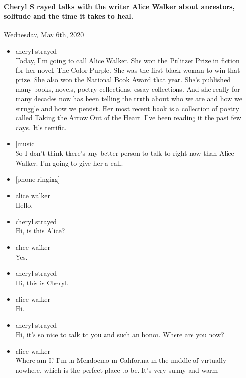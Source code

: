 \hypertarget{cheryl-strayed-talks-with-the-writer-alice-walker-about-ancestors-solitude-and-the-time-it-takes-to-heal-2}{%
\paragraph{Cheryl Strayed talks with the writer Alice Walker about
ancestors, solitude and the time it takes to
heal.}\label{cheryl-strayed-talks-with-the-writer-alice-walker-about-ancestors-solitude-and-the-time-it-takes-to-heal-2}}

Wednesday, May 6th, 2020

\begin{itemize}
\item
  cheryl strayed\\
  Today, I'm going to call Alice Walker. She won the Pulitzer Prize in
  fiction for her novel, The Color Purple. She was the first black woman
  to win that prize. She also won the National Book Award that year.
  She's published many books, novels, poetry collections, essay
  collections. And she really for many decades now has been telling the
  truth about who we are and how we struggle and how we persist. Her
  most recent book is a collection of poetry called Taking the Arrow Out
  of the Heart. I've been reading it the past few days. It's terrific.
\item
  {[}music{]}\\
  So I don't think there's any better person to talk to right now than
  Alice Walker. I'm going to give her a call.
\item
  {[}phone ringing{]}
\item
  alice walker\\
  Hello.
\item
  cheryl strayed\\
  Hi, is this Alice?
\item
  alice walker\\
  Yes.
\item
  cheryl strayed\\
  Hi, this is Cheryl.
\item
  alice walker\\
  Hi.
\item
  cheryl strayed\\
  Hi, it's so nice to talk to you and such an honor. Where are you now?
\item
  alice walker\\
  Where am I? I'm in Mendocino in California in the middle of virtually
  nowhere, which is the perfect place to be. It's very sunny and warm

\end{itemize}
